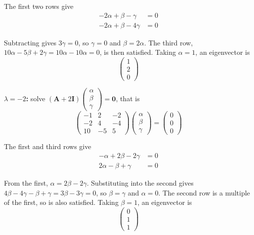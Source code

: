 \documentclass[leqno]{article}
\begin{document}
\begin{enumerate}[
  label=\textbf{\arabic*.},
  leftmargin=*,
  topsep=0pt,
  partopsep=0pt,
  parsep=0pt
]
\begin{djsSolution}
\begin{enumerate}[label=\textbf{(\alph*)}, start=1]
\begin{enumerate}[label=(\roman*), start=1]
The first two rows give
\begin{align*}
-2\alpha+\beta-\gamma&=0\\
-2\alpha+\beta-4\gamma&=0
\end{align*}

Subtracting gives \(3\gamma=0\), so \(\gamma=0\) and \(\beta=2\alpha\). The third row, \(10\alpha-5\beta+2\gamma=10\alpha-10\alpha=0\), is then satisfied. Taking \(\alpha=1\), an eigenvector is
\[
\begin{pmatrix}1\\ 2\\ 0\end{pmatrix}
\]

\textbf{\(\lambda=-2\):} solve \((\mathbf{A}+2\mathbf{I})\begin{pmatrix}\alpha\\ \beta\\ \gamma\end{pmatrix}=\mathbf{0}\), that is
\[
\begin{pmatrix}-1&2&-2\\ -2&4&-4\\ 10&-5&5\end{pmatrix}\begin{pmatrix}\alpha\\ \beta\\ \gamma\end{pmatrix}=\begin{pmatrix}0\\ 0\\ 0\end{pmatrix}
\]

The first and third rows give
\begin{align*}
-\alpha+2\beta-2\gamma&=0\\
2\alpha-\beta+\gamma&=0
\end{align*}

From the first, \(\alpha=2\beta-2\gamma\). Substituting into the second gives \(4\beta-4\gamma-\beta+\gamma=3\beta-3\gamma=0\), so \(\beta=\gamma\) and \(\alpha=0\). The second row is a multiple of the first, so is also satisfied. Taking \(\beta=1\), an eigenvector is
\[
\begin{pmatrix}0\\ 1\\ 1\end{pmatrix}
\]


\end{enumerate}
\end{enumerate}
\end{djsSolution}
\end{enumerate}
\end{document}
